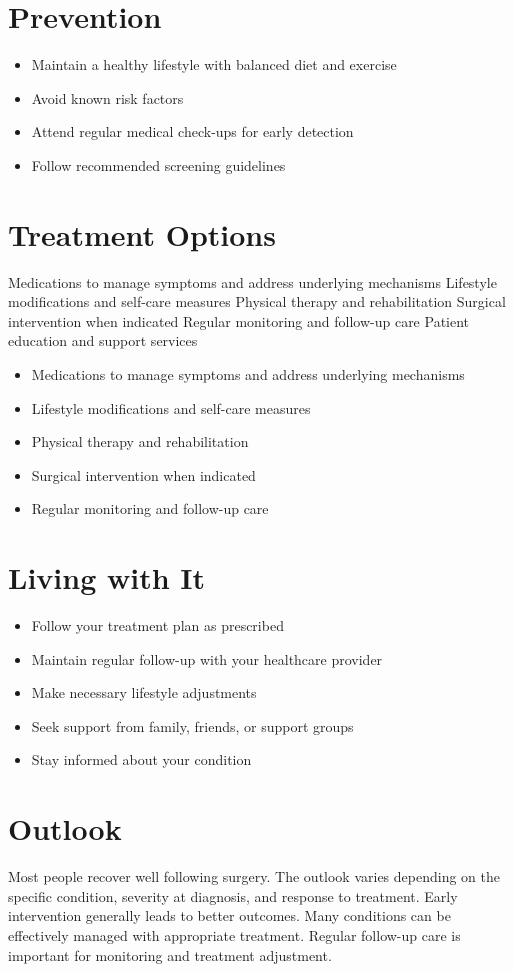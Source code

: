 \section{Prevention}
\begin{itemize}[noitemsep]
  \item Maintain a healthy lifestyle with balanced diet and exercise
  \item Avoid known risk factors
  \item Attend regular medical check-ups for early detection
  \item Follow recommended screening guidelines
\end{itemize}
\section{Treatment Options}
Medications to manage symptoms and address underlying mechanisms Lifestyle modifications and self-care measures Physical therapy and rehabilitation Surgical intervention when indicated Regular monitoring and follow-up care Patient education and support services

\begin{itemize}[noitemsep]
  \item Medications to manage symptoms and address underlying mechanisms
  \item Lifestyle modifications and self-care measures
  \item Physical therapy and rehabilitation
  \item Surgical intervention when indicated
  \item Regular monitoring and follow-up care
\end{itemize}
\section{Living with It}
\begin{itemize}[noitemsep]
  \item Follow your treatment plan as prescribed
  \item Maintain regular follow-up with your healthcare provider
  \item Make necessary lifestyle adjustments
  \item Seek support from family, friends, or support groups
  \item Stay informed about your condition
\end{itemize}
\section{Outlook}
Most people recover well following surgery. The outlook varies depending on the specific condition, severity at diagnosis, and response to treatment. Early intervention generally leads to better outcomes. Many conditions can be effectively managed with appropriate treatment. Regular follow-up care is important for monitoring and treatment adjustment.
